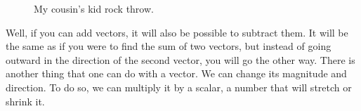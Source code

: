 \documentclass[a4,12pt,twosided,openany]{memoir}
\begin{document}
\begin{figure}[h!]
\begin{center}
\end{center}
\caption{My cousin's kid rock throw.}\label{fig:exampleVectorAddition}
\end{figure}

\par 
\indent
Well, if you can add vectors, it will also be possible to subtract them. It will be the same as if you were to find the sum of two vectors, but instead of going outward in the direction of the second vector, you will go the other way. There is another thing that one can do with a vector. We can change its magnitude and direction. To do so, we can multiply it by a scalar, a number that will stretch or shrink it.
\end{document}
